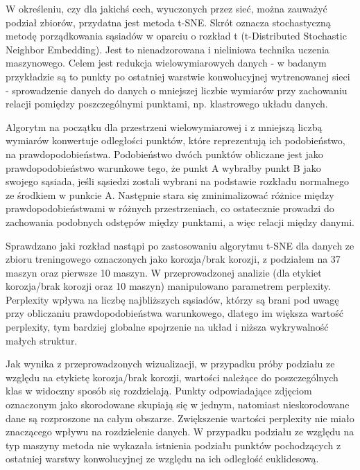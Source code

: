 \documentclass[polish,12pt]{aghthesis}
\begin{document}
\par W określeniu, czy dla jakichś cech, wyuczonych przez sieć, można zauważyć podział zbiorów, przydatna jest metoda t-SNE. Skrót oznacza stochastyczną metodę porządkowania sąsiadów w oparciu o rozkład t (t-Distributed Stochastic Neighbor Embedding). Jest to nienadzorowana i nieliniowa technika uczenia maszynowego. Celem jest redukcja wielowymiarowych danych - w badanym przykładzie są to punkty po ostatniej warstwie konwolucyjnej wytrenowanej sieci - sprowadzenie danych do danych o mniejszej liczbie wymiarów przy zachowaniu relacji pomiędzy poszczególnymi punktami, np. klastrowego układu danych. 

Algorytm \cite{artMaaten} na początku dla przestrzeni wielowymiarowej i z mniejszą liczbą wymiarów konwertuje odległości punktów, które reprezentują ich podobieństwo, na prawdopodobieństwa. Podobieństwo dwóch punktów obliczane jest jako prawdopodobieństwo warunkowe tego, że punkt A wybrałby punkt B jako swojego sąsiada, jeśli sąsiedzi zostali wybrani na podstawie rozkładu normalnego ze środkiem w punkcie A. Następnie stara się zminimalizować różnice między prawdopodobieństwami w różnych przestrzeniach, co ostatecznie prowadzi do zachowania podobnych odstępów między punktami, a więc relacji między danymi.

Sprawdzano jaki rozkład nastąpi po zastosowaniu algorytmu t-SNE dla danych ze zbioru treningowego oznaczonych jako korozja/brak korozji, z podziałem na 37 maszyn oraz pierwsze 10 maszyn.
W przeprowadzonej analizie (dla etykiet korozja/brak korozji oraz 10 maszyn) manipulowano parametrem perplexity. Perplexity wpływa na liczbę najbliższych sąsiadów, którzy są brani pod uwagę przy obliczaniu prawdopodobieństwa warunkowego, dlatego im większa wartość perplexity, tym bardziej globalne spojrzenie na układ i niższa wykrywalność małych struktur. 

Jak wynika z przeprowadzonych wizualizacji, w przypadku próby podziału ze względu na etykietę korozja/brak korozji, wartości należące do poszczególnych klas w widoczny sposób się rozdzielają. Punkty odpowiadające zdjęciom oznaczonym jako skorodowane skupiają się w jednym, natomiast nieskorodowane dane są rozproszone na całym obszarze. Zwiększenie wartości perplexity nie miało znaczącego wpływu na rozdzielenie danych. W przypadku podziału ze względu na typ maszyny metoda nie wykazała istnienia podziału punktów pochodzących z ostatniej warstwy konwolucyjnej ze względu na ich odległość euklidesową.
\end{document}
